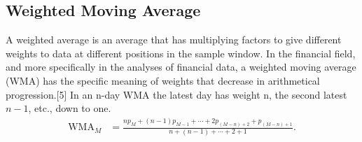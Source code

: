 \documentclass[letterpaper, 11pt]{article}
\newcommand{\1}{\mathds{1}}		%
\theoremstyle{definition}
\begin{document}
    \pagebreak 
    \subsection{Weighted Moving Average}
    \bigbreak \noindent 
    A weighted average is an average that has multiplying factors to give different weights to data at different positions in the sample window.
    \bigbreak \noindent 
    In the financial field, and more specifically in the analyses of financial data, a weighted moving average (WMA) has the specific meaning of weights that decrease in arithmetical progression.[5] In an n-day WMA the latest day has weight n, the second latest $n-1$, etc., down to one.
    \begin{align*}
        \text{WMA}_{M} &= \frac{np_{M} + (n-1)p_{M-1} + \cdots + 2p_{(M-n)+2} + p_{(M-n)+1}}{n+(n-1) + \cdots + 2 + 1}
    .\end{align*}


    \pagebreak
\end{document}
